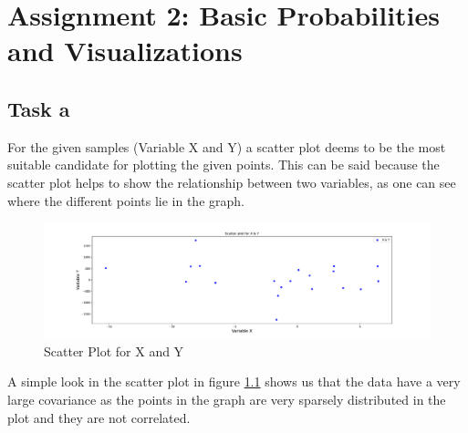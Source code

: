 \chapter{Assignment 2: Basic Probabilities and Visualizations}

\section{Task a}
For the given samples (Variable X and Y) a scatter plot deems to be the most suitable candidate for plotting the given points. This can be said because the scatter plot helps to show the relationship between two variables, as one can see where the different points lie in the graph.

\begin{figure}[h!]
\centering
\includegraphics[width=\textwidth]{pics/task_2_a.pdf}
\caption{Scatter Plot for X and Y}\label{fig:task_2_a}
\end{figure}
\FloatBarrier
A simple look in the scatter plot in figure \ref{fig:task_2_a} shows us that the data have a very large covariance as the points in the graph are very sparsely distributed in the plot and they are not correlated. 

